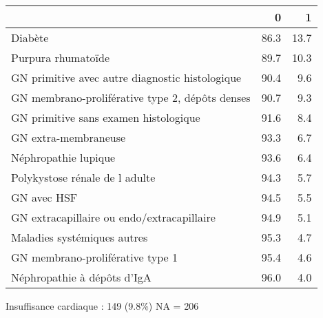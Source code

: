 \documentclass[11pt,a4paper]{article}\usepackage[]{graphicx}\usepackage[]{color}
\begin{document}
\begin{table}[H]
\centering
\begin{tabular}{lrr}
  \hline
 & 0 & 1 \\ 
  \hline
Diabète & 86.3 & 13.7 \\ 
  Purpura rhumatoïde & 89.7 & 10.3 \\ 
  GN primitive avec autre diagnostic histologique & 90.4 & 9.6 \\ 
  GN membrano-proliférative type 2, dépôts denses & 90.7 & 9.3 \\ 
  GN primitive sans examen histologique & 91.6 & 8.4 \\ 
  GN extra-membraneuse & 93.3 & 6.7 \\ 
  Néphropathie lupique & 93.6 & 6.4 \\ 
  Polykystose rénale de l adulte & 94.3 & 5.7 \\ 
  GN avec HSF & 94.5 & 5.5 \\ 
  GN extracapillaire ou endo/extracapillaire & 94.9 & 5.1 \\ 
  Maladies systémiques autres & 95.3 & 4.7 \\ 
  GN membrano-proliférative type 1 & 95.4 & 4.6 \\ 
  Néphropathie à dépôts d'IgA & 96.0 & 4.0 \\ 
   \hline
\end{tabular}
\end{table}


Insuffisance cardiaque : 149 (9.8\%) NA = 206
\end{document}
